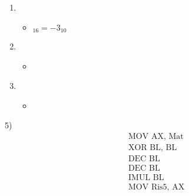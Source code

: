 \documentclass[a4paper, 12pt]{article} %
\begin{document}
\begin{enumerate}
\begin{itemize}
\begin{equation*}
\begin{tikzpicture}[
				every node/.style={column sep=.5mm,row sep=1mm}]
				\draw[-,color=black,semithick] (m-2-2.south west) -- (m-2-17.south east);
			\end{tikzpicture}
		\end{equation*}
	\item {} \\
	\end{itemize}
	\item {} \\
	\begin{itemize}
		\item {} $_{16} = -3_{10}$ \\
	\end{itemize}
	\item {}
	\begin{itemize}
		\item {} \\
	\end{itemize}
	\item {} \\
	\begin{itemize}
		\item {} \\
	\end{itemize}
\end{enumerate}


\pagebreak

\textsf{\large{\color{red} 5) }} \\

\begin{align*}
	&\text{MOV AX, Mat} \\
	&\text{XOR BL, BL} \\
	&\text{DEC BL} \\
	&\text{DEC BL} \\
	&\text{IMUL BL} \\
	&\text{MOV Ris5, AX} \\
\end{align*}
\end{document}
